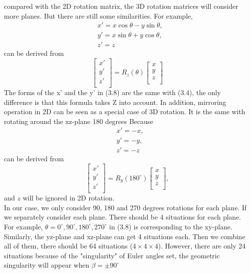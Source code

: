 compared with the 2D rotation matrix, the 3D rotation matrices will consider more planes. But there are still some similarities. For example,
\begin{equation}
\begin{aligned}
&x'=x\cos\theta-y\sin\theta,\\ 
&y'=x\sin\theta+y\cos\theta,\\
&z'=z
\end{aligned}
\end{equation}
can be derived from
\begin{equation}
\begin{bmatrix}
x'\\
y'\\
z'\\
\end{bmatrix}
=R_{z}(\theta)
\begin{bmatrix}
x\\
y\\
z\\
\end{bmatrix}
\end{equation}
The forms of the x' and the y' in (3.8) are the same with (3.4), the only difference is that this formula takes Z into account. In addition, mirroring operation in 2D can be seen as a special case of 3D rotation. It is the same with rotating around the xz-plane 180 degrees Because 
\begin{equation}
\begin{aligned}
&x'=-x,\\
&y'=-y,\\
&z'=-z
\end{aligned}
\end{equation}
can be derived from 
\begin{equation}
\begin{bmatrix}
x'\\
y'\\
z'\\
\end{bmatrix}
=R_{y}(180^{\circ})
\begin{bmatrix}
x\\
y\\
z\\
\end{bmatrix},
\end{equation}
and $z$ will be ignored in 2D rotation.\\
In our case, we only consider 90, 180 and 270 degrees rotations for each plane. If we separately consider each plane. There should be 4 situations for each plane. For example, $\theta=0^{\circ}, 90^{\circ}, 180^{\circ}, 270^{\circ}$ in (3.8) is corresponding to the xy-plane. Similarly, the yz-plane and xz-plane can get 4 situations each. Then we combine all of them, there should be 64 situations ($4\times 4 \times 4$). However, there are only 24 situations because of the "singularity" of Euler angles set, the geometric singularity will appear when $\beta=\pm90^{\circ}$ 

